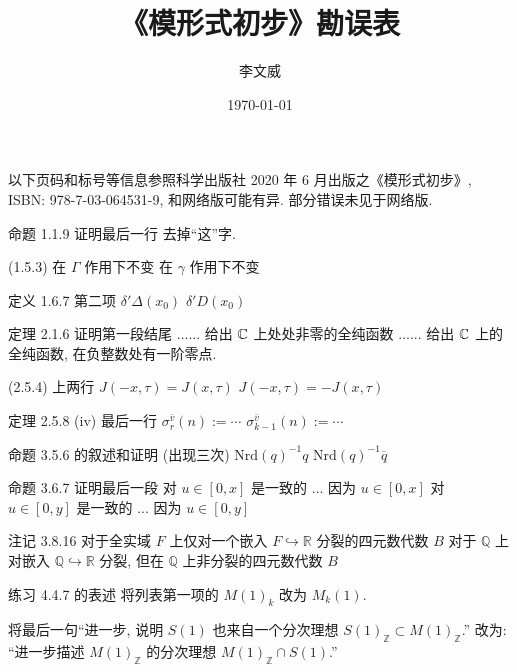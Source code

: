 \documentclass{AJerrata}
\title{\bfseries 《模形式初步》勘误表}
\author{李文威}
\date{\today}
\begin{document}
	\maketitle
	以下页码和标号等信息参照科学出版社 2020 年 6 月出版之《模形式初步》, ISBN: 978-7-03-064531-9, 和网络版可能有异. 部分错误未见于网络版.
	
	\begin{Errata}
		\item[命题 1.1.9 证明最后一行]
		去掉``这''字.
		
		\item[(1.5.3)]
		\Orig 在 $\Gamma$ 作用下不变
		\Corr 在 $\gamma$ 作用下不变
		
		\item[定义 1.6.7 第二项]
		\Orig $\delta' \Delta(x_0)$
		\Corr $\delta' D(x_0)$
		
		\item[定理 2.1.6 证明第一段结尾]
		\Orig ...... 给出 $\mathbb{C}$ 上处处非零的全纯函数
		\Corr ...... 给出 $\mathbb{C}$ 上的全纯函数, 在负整数处有一阶零点. 

		\item[(2.5.4) 上两行]
		\Orig $J(-x, \tau) = J(x, \tau)$
		\Corr $J(-x, \tau) = -J(x, \tau)$

        \item[定理 2.5.8 (iv) 最后一行]
        \Orig $\sigma^{\bar{v}}_r(n) := \cdots$
        \Corr $\sigma^{\bar{v}}_{k-1}(n) := \cdots$
		
		\item[命题 3.5.6 的叙述和证明 (出现三次)]
		\Orig $\mathrm{Nrd}(q)^{-1} q$
		\Corr $\mathrm{Nrd}(q)^{-1} \overline{q}$ 
		
		\item[命题 3.6.7 证明最后一段]
		\Orig 对 $u \in [0,x]$ 是一致的 ... 因为 $u \in [0,x]$
		\Corr 对 $u \in [0,y]$ 是一致的 ... 因为 $u \in [0,y]$
		
		\item[注记 3.8.16]
		\Orig 对于全实域 $F$ 上仅对一个嵌入 $F \hookrightarrow \mathbb{R}$ 分裂的四元数代数 $B$
		\Corr 对于 $\mathbb{Q}$ 上对嵌入 $\mathbb{Q} \hookrightarrow \mathbb{R}$ 分裂, 但在 $\mathbb{Q}$ 上非分裂的四元数代数 $B$ 
		
		\item[练习 4.4.7 的表述]
		将列表第一项的 $M(1)_k$ 改为 $M_k(1)$.
		
		将最后一句``进一步, 说明 $S(1)$ 也来自一个分次理想 $S(1)_{\mathbb{Z}} \subset M(1)_{\mathbb{Z}}$.'' 改为: ``进一步描述 $M(1)_{\mathbb{Z}}$ 的分次理想 $M(1)_{\mathbb{Z}} \cap S(1)$.''
		

\end{Errata}
\end{document}
